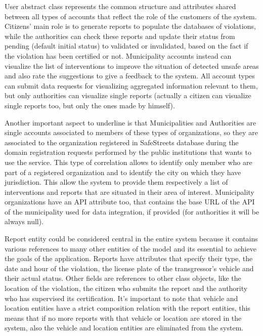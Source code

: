 User abstract class represents the common structure and attributes shared between all types of accounts that reflect the role of the customers of the system. Citizens' main role is to generate reports to populate the databases of violations, while the authorities can check these reports and update their status from pending (default initial status) to validated or invalidated, based on the fact if the violation has been certified or not. Municipality accounts instead can visualize the list of interventions to improve the situation of detected unsafe areas and also rate the suggestions to give a feedback to the system. All account types can submit data requests for visualizing aggregated information relevant to them, but only authorities can visualize single reports (actually a citizen can visualize single reports too, but only the ones made by himself).

Another important aspect to underline is that Municipalities and Authorities are single accounts associated to members of these types of organizations, so they are associated to the organization registered in SafeStreets database during the domain registration requests performed by the public institutions that wants to use the service. This type of correlation allows to identify only member who are part of a registered organization and to identify the city on which they have jurisdiction. This allow the system to provide them respectively a list of  interventions and reports that are situated in their area of interest. Municipality organizations have an API attribute too, that contains the base URL of the API of the municipality used for data integration, if provided (for authorities it will be always null).

Report entity could be considered central in the entire system because it contains various references to many other entities of the model and its essential to achieve the goals of the application. Reports have attributes that specify their type, the date and hour of the violation, the license plate of the transgressor's vehicle and their actual status. Other fields are references to other class objects, like the location of the violation, the citizen who submits the report and the authority who has supervised its certification. It's important to note that vehicle and location entities have a strict composition relation with the report entities, this means that if no more reports with that vehicle or location are stored in the system, also the vehicle and location entities are eliminated from the system.


